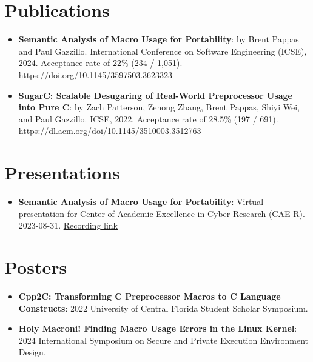 \documentclass{article}
\newcommand{\resumeItem}[2]{
  \item\small{
    \textbf{#1}{: #2 \vspace{-2pt}}
  }
}
\newcommand{\resumeSubItem}[2]{\resumeItem{#1}{#2}\vspace{-3pt}}
\newcommand{\resumeSubHeadingListStart}{\begin{itemize}[leftmargin=*, label={}]}
\newcommand{\resumeSubHeadingListEnd}{\end{itemize}}
\begin{document}
\vspace{-5pt}
\section{Publications}
\resumeSubHeadingListStart{}

\resumeSubItem{Semantic Analysis of Macro Usage for Portability}
{by Brent Pappas and Paul Gazzillo. International Conference on Software Engineering (ICSE), 2024. Acceptance rate of 22\% (234 / 1,051).
	\url{https://doi.org/10.1145/3597503.3623323}}

\resumeSubItem{SugarC\@: Scalable Desugaring of Real-World Preprocessor Usage into Pure C}
{by Zach Patterson, Zenong Zhang, Brent Pappas, Shiyi Wei, and Paul Gazzillo. ICSE, 2022. Acceptance rate of 28.5\% (197 / 691).
	\url{https://dl.acm.org/doi/10.1145/3510003.3512763}}
\resumeSubHeadingListEnd{}

\vspace{-5pt}
\section{Presentations}
\resumeSubHeadingListStart{}
\resumeSubItem{Semantic Analysis of Macro Usage for Portability}
{Virtual presentation for Center of Academic Excellence in Cyber Research (CAE-R). 2023{-}08{-}31. \href{https://drive.google.com/file/d/1xCd34w54hs1iyaoXHz0MUkwlH-fP3HLo/view} {Recording link}}
\resumeSubHeadingListEnd{}

\vspace{-5pt}
\section{Posters}
\resumeSubHeadingListStart{}
\resumeSubItem{Cpp2C\@: Transforming C Preprocessor Macros to C Language Constructs}
{2022 University of Central Florida Student Scholar Symposium.}
\resumeSubItem{Holy Macroni! Finding Macro Usage Errors in the Linux Kernel}
{2024 International Symposium on Secure and Private Execution Environment Design.}
\resumeSubHeadingListEnd{}

\vspace{-5pt}
\end{document}
